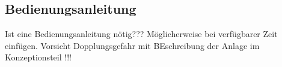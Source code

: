 \documentclass[../../../Bachelorarbeit.tex]{subfiles}
\begin{document}
\subsection{Bedienungsanleitung}
\color{red}
Ist eine Bedienungsanleitung nötig??? Möglicherweise bei verfügbarer Zeit einfügen. Vorsicht Dopplungsgefahr mit BEschreibung der Anlage im Konzeptionsteil !!!
\end{document}
